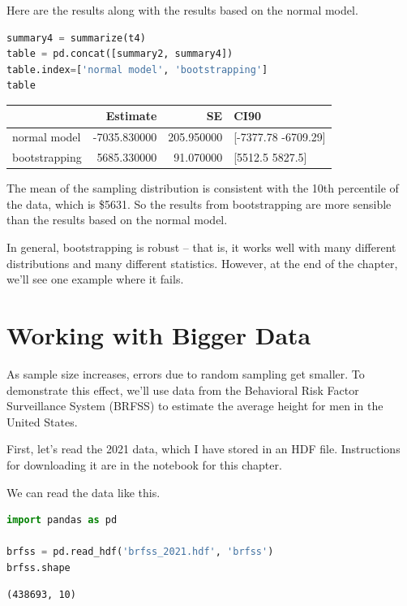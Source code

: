 Here are the results along with the results based on the normal model.

\begin{lstlisting}[language=Python,style=source]
summary4 = summarize(t4)
table = pd.concat([summary2, summary4])
table.index=['normal model', 'bootstrapping']
table
\end{lstlisting}

\begin{tabular}{lrrl}
\midrule
 & Estimate & SE & CI90 \\
\midrule
normal model & -7035.830000 & 205.950000 & [-7377.78 -6709.29] \\
bootstrapping & 5685.330000 & 91.070000 & [5512.5 5827.5] \\
\midrule
\end{tabular}

The mean of the sampling distribution is consistent with the 10th
percentile of the data, which is \$5631. So the results from
bootstrapping are more sensible than the results based on the normal
model.

In general, bootstrapping is robust -- that is, it works well with many
different distributions and many different statistics. However, at the
end of the chapter, we'll see one example where it fails.

\section{Working with Bigger Data}\label{working-with-bigger-data}

As sample size increases, errors due to random sampling get smaller. To
demonstrate this effect, we'll use data from the Behavioral Risk Factor
Surveillance System (BRFSS) to estimate the average height for men in
the United States.

First, let's read the 2021 data, which I have stored in an HDF file.
Instructions for downloading it are in the notebook for this chapter.

We can read the data like this.

\begin{lstlisting}[language=Python,style=source]
import pandas as pd

brfss = pd.read_hdf('brfss_2021.hdf', 'brfss')
brfss.shape
\end{lstlisting}

\begin{lstlisting}[style=output]
(438693, 10)
\end{lstlisting}

